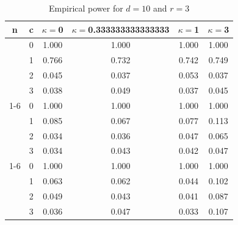 \documentclass[oneside,11pt]{article}
\begin{document}
\begin{table}[H]
\centering
\caption{Empirical power for $d = 10$ and $r = 3$}
\centering
\begin{tabular}[t]{cccccc}
\toprule
n & c & $\kappa = $0 & $\kappa = $0.333333333333333 & $\kappa = $1 & $\kappa = $3\\
\midrule
 & 0 & 1.000 & 1.000 & 1.000 & 1.000\\

 & 1 & 0.766 & 0.732 & 0.742 & 0.749\\

 & 2 & 0.045 & 0.037 & 0.053 & 0.037\\

\multirow{-4}{*}{\centering\arraybackslash 10} & 3 & 0.038 & 0.049 & 0.037 & 0.045\\
\cmidrule{1-6}
 & 0 & 1.000 & 1.000 & 1.000 & 1.000\\

 & 1 & 0.085 & 0.067 & 0.077 & 0.113\\

 & 2 & 0.034 & 0.036 & 0.047 & 0.065\\

\multirow{-4}{*}{\centering\arraybackslash 50} & 3 & 0.034 & 0.043 & 0.042 & 0.047\\
\cmidrule{1-6}
 & 0 & 1.000 & 1.000 & 1.000 & 1.000\\

 & 1 & 0.063 & 0.062 & 0.044 & 0.102\\

 & 2 & 0.049 & 0.043 & 0.041 & 0.087\\

\multirow{-4}{*}{\centering\arraybackslash 100} & 3 & 0.036 & 0.047 & 0.033 & 0.107\\
\bottomrule
\end{tabular}
\end{table}
\end{document}
